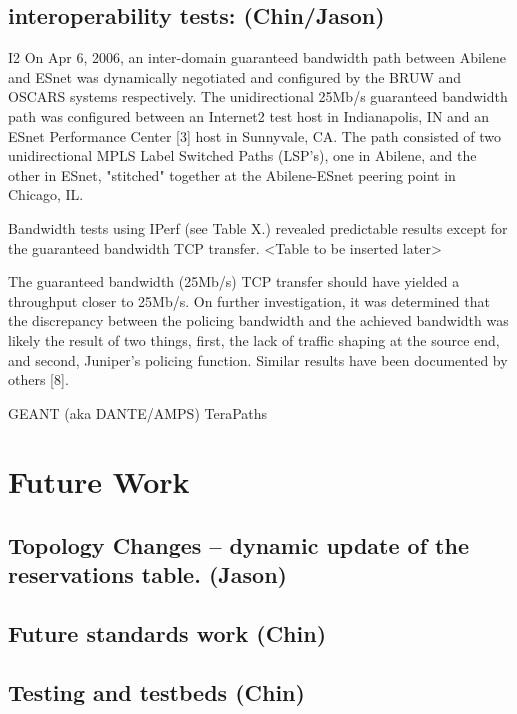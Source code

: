 \documentclass[conference]{IEEEtran}
\begin{document}
\subsection{interoperability tests:  (Chin/Jason)}
I2
On Apr 6, 2006, an inter-domain guaranteed bandwidth path between Abilene and 
ESnet was dynamically negotiated and configured by the BRUW and OSCARS systems 
respectively. The unidirectional 25Mb/s guaranteed bandwidth path was configured 
between an Internet2 test host in Indianapolis, IN and an ESnet Performance Center 
[3] host in Sunnyvale, CA.  The path consisted of two unidirectional MPLS Label 
Switched Paths (LSP's), one in Abilene, and the other in ESnet, "stitched" 
together at the Abilene-ESnet peering point in Chicago, IL.

Bandwidth tests using IPerf (see Table X.) revealed predictable results except for 
the guaranteed bandwidth TCP transfer.
<Table to be inserted later>

The guaranteed bandwidth (25Mb/s) TCP transfer should have yielded a throughput 
closer to 25Mb/s.  On further investigation, it was determined that the discrepancy 
between the policing bandwidth and the achieved bandwidth was likely the result of 
two things, first, the lack of traffic shaping at the source end, and second, 
Juniper's policing function.  Similar results have been documented by others [8].

GEANT (aka DANTE/AMPS)
TeraPaths

\section{Future Work}
\subsection{Topology Changes -- dynamic update of the reservations table. (Jason)}
\subsection{Future standards work (Chin)}
\subsection{Testing and testbeds (Chin)}


%
\end{document}
